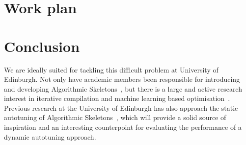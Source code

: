 \section{Work plan}

\section{Conclusion}

We are ideally suited for tackling this difficult problem at
University of Edinburgh. Not only have academic members been
responsible for introducing and developing Algorithmic
Skeletons~\cite{Cole1989, Cole2004, Benoit2005a}, but there is a large
and active research interest in iterative compilation and machine
learning based optimisation~\cite{Fursin2008, Agakov,
Fursin2005}. Previous research at the University of Edinburgh has also
approach the static autotuning of Algorithmic
Skeletons~\cite{Collins2012, Collins2013}, which will provide a solid
source of inspiration and an interesting counterpoint for evaluating
the performance of a dynamic autotuning approach.


